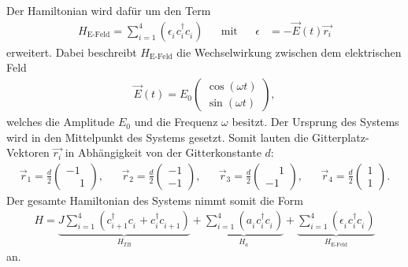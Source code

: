 Der Hamiltonian wird dafür um den Term
\begin{align}
  H_\text{E-Feld}=\sum_{i=1}^4\left(\epsilon_i^{\phantom{\dag}} c_i^\dag c_i^{\phantom{\dag}}\right)& &\text{mit}& &\epsilon&=-\vec{E}(t) \vec{r_i}
\end{align}
erweitert.
 Dabei beschreibt $H_\text{E-Feld}$ die Wechselwirkung zwischen dem elektrischen Feld
\begin{align}
  \vec E(t)=E_0\begin{pmatrix}
\cos\left(\omega t\right)\\
\sin\left(\omega t\right)
 \end{pmatrix},
\end{align}
welches die Amplitude $E_0$ und
die Frequenz $\omega$ besitzt.
Der Ursprung des Systems wird
in den Mittelpunkt des Systems gesetzt.
Somit lauten die Gitterplatz-Vektoren
$\vec{r_i}$ in Abhängigkeit von der
Gitterkonstante $d$:
\begin{align}
  \vec{r}_1=\frac{d}{2}\begin{pmatrix}-1  \\ \phantom{-}1 \end{pmatrix},& &
  \vec{r}_2=\frac{d}{2}\begin{pmatrix}-1  \\ -1 \end{pmatrix},& &
  \vec{r}_3=\frac{d}{2}\begin{pmatrix}\phantom{-}1  \\ -1 \end{pmatrix},& &
  \vec{r}_4=\frac{d}{2}\begin{pmatrix}1  \\ 1 \end{pmatrix}.
\end{align}
Der gesamte Hamiltonian des Systems nimmt somit die Form
\begin{align}
H=\underbrace{J\sum_{i=1}^4 \left(c_{i+1}^\dag c_i^{\phantom{\dag}} + c_{i}^\dag c_{i+1}^{\phantom{\dag}}\right)}_{H_{TB}}
+\underbrace{\sum_{i=1}^4 \left(a_i^{\phantom{\dag}} c_i^\dag c_i^{\phantom{\dag}}\right)}_{H_a}
+\underbrace{\sum_{i=1}^4 \left(\epsilon^{\phantom{\dag}}_i c_i^\dag c_i^{\phantom{\dag}}\right)}_{H_\text{E-Feld}}
\end{align}
an.


